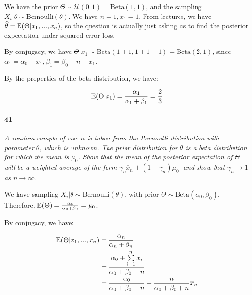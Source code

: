            We have the prior $\Theta \sim \mathcal{U}(0, 1) =
            \text{Beta}(1, 1)$, and the sampling $X_i | \theta \sim
            \text{Bernoulli}(\theta)$. We have $n = 1, x_1 = 1$. From
            lectures, we have $\widehat \theta = \mathbb{E}(\Theta | x_1, ...,
            x_n)$, so the question is actually just asking us to find the
            posterior expectation under squared error loss.

            By conjugacy, we have $\Theta | x_1 \sim \text{Beta}(1 + 1, 1 +
            1 - 1) = \text{Beta}(2, 1)$, since $\alpha_1 = \alpha_0 + x_1,
            \beta_1 = \beta_0 + n - x_1$.

            By the properties of the beta distribution, we have:

            \[
                \mathbb{E}(\Theta | x_1) = \frac{\alpha_1}{\alpha_1 + \beta_1} =
                \frac{2}{3}
            \]

        \paragraph{41}
        \textit{A random sample of size $n$ is taken from the Bernoulli
        distribution with parameter $\theta$, which is unknown. The prior
        distribution for $\theta$ is a beta distribution for which the mean
        is $\mu_0$. Show that the mean of the posterior expectation of
        $\Theta$ will be a weighted average of the form $\gamma_n \overline
        x_n + (1 - \gamma_n)\mu_0$, and show that $\gamma_n \to 1$ as $n \to
        \infty$.}

            We have sampling $X_i | \theta \sim \text{Bernoulli}(\theta)$,
            with prior $\Theta \sim \text{Beta}(\alpha_0, \beta_0)$.
            Therefore, $\mathbb{E}(\Theta) = \frac{\alpha_0}{\alpha_0 + \beta_0} =
            \mu_0$.

            By conjugacy, we have:

            \begin{align*}
                \mathbb{E}(\Theta | x_1, ..., x_n) & = \frac{\alpha_n}{\alpha_n +
                    \beta_n} \\
                & = \frac{\alpha_0 + \sum\limits_{i=1}^n x_i} {\alpha_0 +
                    \beta_0 + n} \\
                & = \frac{\alpha_0}{\alpha_0 + \beta_0 + n} + \frac{n}
                    {\alpha_0 + \beta_0 + n}\overline x_n
            \end{align*}

